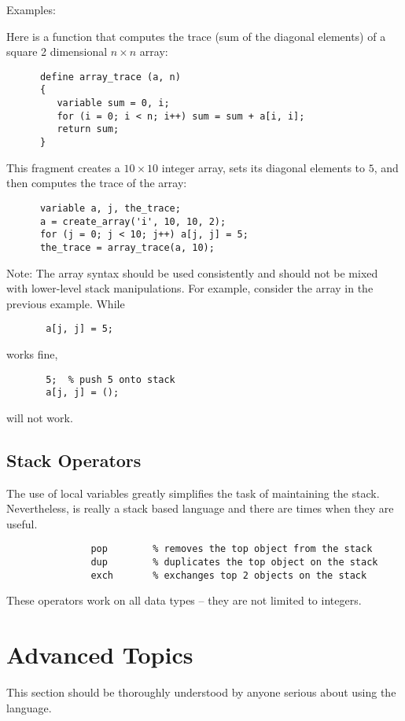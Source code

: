    Examples:

   Here is a function that computes the trace (sum of the diagonal elements)
   of a square 2 dimensional $n \times n$ array:

\begin{verbatim}
      define array_trace (a, n)
      {
         variable sum = 0, i;
         for (i = 0; i < n; i++) sum = sum + a[i, i];
         return sum;
      }
\end{verbatim}
   This fragment creates a $10 \times 10$ integer array, sets its diagonal
   elements to $5$, and then computes the trace of the array:
\begin{verbatim}
      variable a, j, the_trace;
      a = create_array('i', 10, 10, 2);
      for (j = 0; j < 10; j++) a[j, j] = 5;
      the_trace = array_trace(a, 10);
\end{verbatim}

   Note: The array syntax should be used consistently and should not
   be mixed with lower-level stack manipulations.  For example,
   consider the array  in the previous example.  While
\begin{verbatim} 
       a[j, j] = 5;
\end{verbatim} 
   works fine, 
\begin{verbatim} 
       5;  % push 5 onto stack
       a[j, j] = ();
\end{verbatim} 
   will not work.

\subsection{Stack Operators}

   The use of local variables greatly simplifies the task of maintaining the
   stack.  Nevertheless, \slang{} is really a stack based language and there
   are times when they are useful.
\begin{verbatim}
               pop        % removes the top object from the stack
               dup        % duplicates the top object on the stack
               exch       % exchanges top 2 objects on the stack
\end{verbatim}
   These operators work on all data types -- they are not limited to
   integers.


\section{Advanced Topics}

   This section should be thoroughly understood by anyone serious about
   using the \slang{} language.

